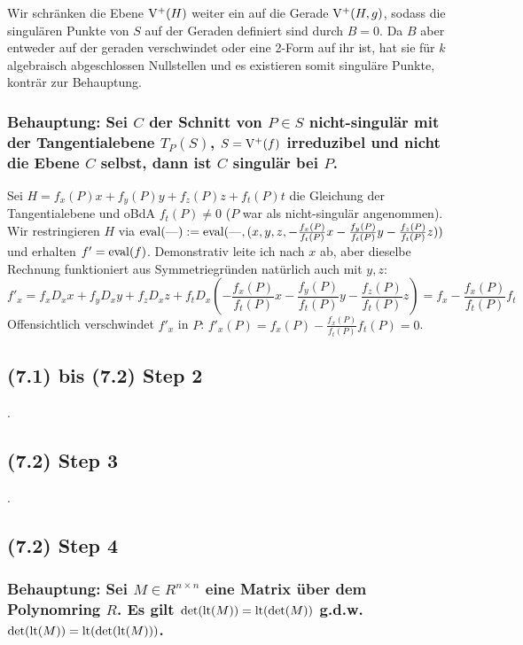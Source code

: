 Wir schränken die Ebene $\operatorname{V^+}(H)$ weiter ein auf die Gerade $\operatorname{V^+}(H,g)$, sodass die singulären Punkte von $S$ auf der Geraden definiert sind durch $B = 0$.
Da $B$ aber entweder auf der geraden verschwindet oder eine 2-Form auf ihr ist, hat sie für $k$ algebraisch abgeschlossen Nullstellen und es existieren somit singuläre Punkte, konträr zur Behauptung.


\subsubsection{ %
Behauptung: Sei $C$ der Schnitt von $P \in S$ nicht-singulär mit der Tangentialebene $T_P(S)$, $S = \operatorname{V^+}(f)$ irreduzibel und nicht die Ebene $C$ selbst, dann ist $C$ singulär bei $P$.
} %

Sei $H = f_x(P)x + f_y(P)y + f_z(P)z + f_t(P)t$ die Gleichung der Tangentialebene und oBdA $f_t(P) \neq 0$ ($P$ war als nicht-singulär angenommen).
Wir restringieren $H$ via ${\operatorname{eval}}({\operatorname{---}}) := {\operatorname{eval}}({\operatorname{---}},(x,y,z,-\frac{f_x(P)}{f_t(P)}x-\frac{f_y(P)}{f_t(P)}y-\frac{f_z(P)}{f_t(P)}z))$ und erhalten
$f' = {\operatorname{eval}}(f)$. Demonstrativ leite ich nach $x$ ab, aber dieselbe Rechnung funktioniert aus Symmetriegründen natürlich auch mit $y,z$:
\begin{equation}
f'_x = f_x D_xx + f_y D_x y + f_z D_x z + f_t D_x (-\frac{f_x(P)}{f_t(P)}x-\frac{f_y(P)}{f_t(P)}y-\frac{f_z(P)}{f_t(P)}z) = f_x - \frac{f_x(P)}{f_t(P)} f_t
\end{equation}
Offensichtlich verschwindet $f'_x$ in $P$: $f'_x(P) = f_x(P) - \frac{f_x(P)}{f_t(P)} f_t(P) = 0$.
\subsection{(7.1) bis (7.2) Step 2} .
\subsection{(7.2) Step 3} .
\subsection{(7.2) Step 4}

\subsubsection{ %
Behauptung: Sei $M \in R^{n\times n}$ eine Matrix über dem Polynomring $R$.
Es gilt $\det({\operatorname{lt}}(M)) = {\operatorname{lt}}(\det(M))$ g.d.w. $\det({\operatorname{lt}}(M)) = {\operatorname{lt}}(\det({\operatorname{lt}}(M)))$.
} %

